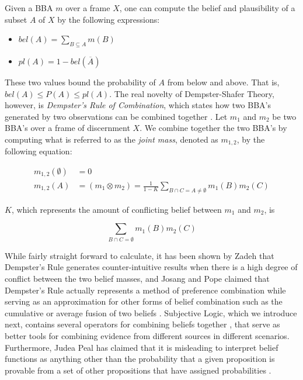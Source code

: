 \documentclass[thesis.tex]{subfiles}
\begin{document}
Given a BBA $m$ over a frame $X$, one can compute the belief and plausibility of a subset
$A$ of $X$ by the following expressions:

\begin{itemize}
  \item $bel(A) = \sum_{B \subseteq A} m(B)$
  \item $pl(A) = 1 - bel(\overline{A})$
\end{itemize}

These two values bound the probability of $A$ from below and above. That is,
$bel(A) \leq P(A) \leq pl(A)$. The real novelty of Dempster-Shafer Theory, however, is
\emph{Dempster's Rule of Combination}, which states how two BBA's generated
by two observations can be combined together \cite{dempster1968generalization}. Let $m_1$ and $m_2$ be two BBA's over a
frame of discernment $X$. We combine together the two BBA's by computing what is referred to
as the \emph{joint mass}, denoted as $m_{1,2}$, by the following equation:

\begin{equation*}
  \begin{split}
    m_{1,2}\left(\emptyset\right) & = 0 \\
    m_{1,2}\left(A\right)         & = \left( m_1 \otimes m_2\right) = \frac{1}{1 - K} \sum_{B \cap C = A \neq \emptyset} m_1(B) m_2(C)
  \end{split}
\end{equation*}

$K$, which represents the amount of conflicting belief between $m_1$ and $m_2$, is

$$\sum_{B \cap C = \emptyset} m_1(B) m_2(C)$$

While fairly straight forward to calculate, it has been shown by Zadeh \cite{zadeh1979validity, zadeh1986simple}
that Dempster's Rule generates counter-intuitive results when there is a high degree of
conflict between the two belief masses, and Josang and Pope claimed that Dempster's Rule actually
represents a method of preference combination while serving as an approximation for other forms of belief
combination such as the cumulative or average fusion of two beliefs \cite{josang2012dempster}. Subjective Logic, which we introduce next,
contains several operators for combining beliefs together \cite{josang2012interpretation, josang2010cumulative, josang2009fission, josang2009cumulative},
that serve as better tools for combining evidence from different sources in different scenarios.
Furthermore, Judea Peal has claimed that it is misleading to interpret belief functions as anything
other than the probability that a given proposition is provable from a set of other
propositions that have assigned probabilities \cite{pearl1988probabilistic, pearl1988probability, pearl1990reasoning}.
\end{document}
